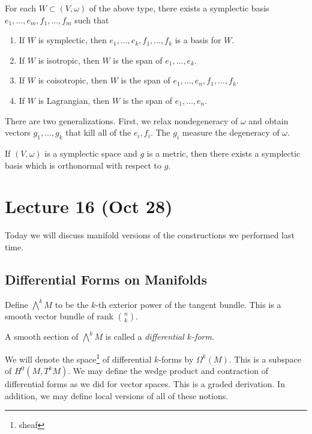 \documentclass[twoside, 10pt]{article}
\begin{document}
    \begin{exer}[Hw4 Problem 12-9]
        For each $W \subset (V,\omega)$ of the above type, there exists a symplectic basis $e_1, \ldots, e_m, f_1, \ldots, f_m$ such that 
        \begin{enumerate}
            \item If $W$ is symplectic, then $e_1, \ldots, e_k, f_1, \ldots, f_k$ is a basis for $W$.
            \item If $W$ is isotropic, then $W$ is the span of $e_1, \ldots, e_k$.
            \item If $W$ is coisotropic, then $W$ is the span of $e_1, \ldots, e_n, f_1, \ldots, f_k$.
            \item If $W$ is Lagrangian, then $W$ is the span of $e_1, \ldots, e_n$.
        \end{enumerate}
    \end{exer}

    There are two generalizations. First, we relax nondegeneracy of $\omega$ and obtain vectors $g_1, \ldots, g_k$ that kill all of the $e_i,f_i$. The $g_i$ measure the degeneracy of $\omega$.

    If $(V,\omega)$ is a symplectic space and $g$ is a metric, then there exists a symplectic basis which is orthonormal with respect to $g$.

    \section{Lecture 16 (Oct 28)}%
    \label{sec:lecture_16_oct_28_}
    
    Today we will discuss manifold versions of the constructions we performed last time. 

    \subsection{Differential Forms on Manifolds}%
    \label{sub:differential_forms_on_manifolds}
    
    Define $\bigwedge^kM$ to be the $k$-th exterior power of the tangent bundle. This is a smooth vector bundle of rank $\binom{n}{k}$.

    \begin{defn}
        A smooth section of $\bigwedge^k M$ is called a \textit{differential $k$-form}.
    \end{defn}

    We will denote the space\footnote{sheaf} of differential $k$-forms by $\Omega^k(M)$. This is a subspace of $H^0(M, T^kM)$. We may define the wedge product and contraction of differential forms as we did for vector spaces. This is a graded derivation. In addition, we may define local versions of all of these notions.
\end{document}
